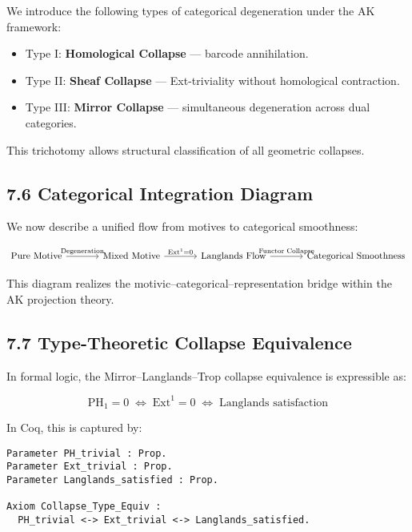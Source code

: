 \documentclass[11pt]{article}
\begin{document}
We introduce the following types of categorical degeneration under the AK framework:

\begin{itemize}
  \item Type I: \textbf{Homological Collapse} — barcode annihilation.
  \item Type II: \textbf{Sheaf Collapse} — Ext-triviality without homological contraction.
  \item Type III: \textbf{Mirror Collapse} — simultaneous degeneration across dual categories.
\end{itemize}

This trichotomy allows structural classification of all geometric collapses.

\subsection*{7.6 Categorical Integration Diagram}

We now describe a unified flow from motives to categorical smoothness:

\[
\begin{tikzcd}[column sep=3.5em]
\text{Pure Motive} \arrow[r, "\text{Degeneration}"]
& \text{Mixed Motive} \arrow[r, "\mathrm{Ext}^1 = 0"]
& \text{Langlands Flow} \arrow[r, "\text{Functor Collapse}"]
& \text{Categorical Smoothness}
\end{tikzcd}
\]


This diagram realizes the motivic–categorical–representation bridge within the AK projection theory.

\subsection*{7.7 Type-Theoretic Collapse Equivalence}

In formal logic, the Mirror–Langlands–Trop collapse equivalence is expressible as:

\[
\text{PH}_1 = 0 \;\Leftrightarrow\; \mathrm{Ext}^1 = 0 \;\Leftrightarrow\; \text{Langlands satisfaction}
\]

In Coq, this is captured by:

\begin{lstlisting}[language=Coq]
Parameter PH_trivial : Prop.
Parameter Ext_trivial : Prop.
Parameter Langlands_satisfied : Prop.

Axiom Collapse_Type_Equiv :
  PH_trivial <-> Ext_trivial <-> Langlands_satisfied.
\end{lstlisting}
\end{document}
